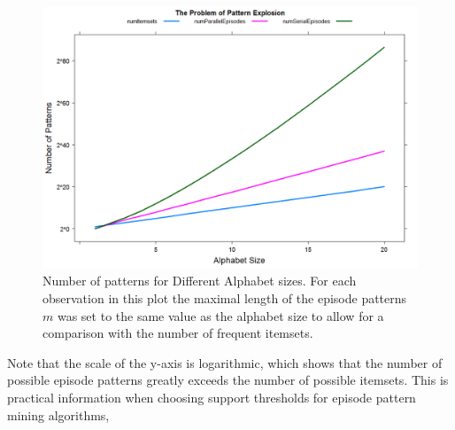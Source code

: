 \begin{figure}[h]
	\centering
  	\includegraphics[width=\textwidth]{patternExplosion}
	\caption[Episode Pattern Explosion]{Number of patterns for Different Alphabet sizes. For each observation in this plot the maximal length of the episode patterns $m$ was set to the same value as the alphabet size to allow for a comparison with the number of frequent itemsets.}
	\label{fig_patternExplosion}
\end{figure}

Note that the scale of the y-axis is logarithmic, which shows that the number of possible episode patterns greatly exceeds the number of possible itemsets. This is practical information when choosing support thresholds for episode pattern mining algorithms, 